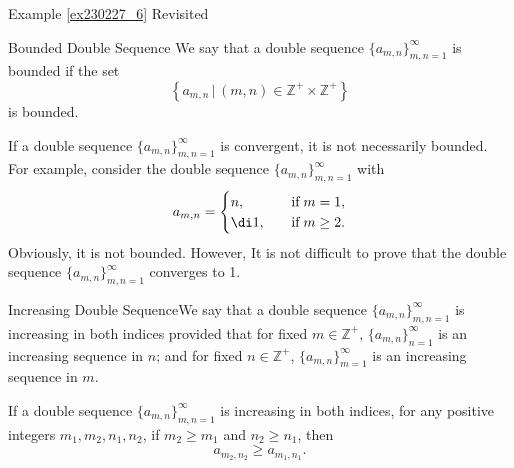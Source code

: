 \begin{example}{\linkt Example \ref{ex230227_6} Revisited}
\begin{example}[label=ex230227_13]{}
\begin{example}{}
\begin{definition}{Bounded Double Sequence}
We say that a double sequence $\{a_{m,n}\}_{m,n=1}^{\infty}$  is bounded if the set \[\left\{a_{m,n}\,|\,(m,n)\in\mathbb{Z}^+\times \mathbb{Z}^+\right\}\] is bounded.
\end{definition}
\begin{remark}
{}If a double sequence $\{a_{m,n}\}_{m,n=1}^{\infty}$  is convergent, it is not necessarily bounded. For example, consider the double  sequence  $\{a_{m,n}\}_{m,n=1}^{\infty}$ with
\[a_{m,n}=\begin{cases}n,\quad &\text{if}\; m=1,\\\di 1,\quad & \text{if}\; m\geq 2.\end{cases}\]
Obviously, it is not bounded. However, It is not difficult to prove that the double sequence $\{a_{m,n}\}_{m,n=1}^{\infty}$   converges to 1.
\end{remark}

\begin{definition}{Increasing Double Sequence}We say that  a double sequence $\{a_{m,n}\}_{m,n=1}^{\infty}$  is increasing in both indices provided that for fixed $m\in \mathbb{Z}^+$, $\{a_{m,n}\}_{n=1}^{\infty}$ is an increasing sequence in $n$; and for fixed $n\in\mathbb{Z}^+$, $\{a_{m,n}\}_{m=1}^{\infty}$ is an increasing sequence in $m$. \end{definition}

If a  double sequence $\{a_{m,n}\}_{m,n=1}^{\infty}$  is increasing in both indices, for any positive integers $m_1, m_2, n_1, n_2$, if $m_2\geq m_1$ and $n_2\geq n_1$, then
\[a_{m_2, n_2}\geq a_{m_1,n_1}.\]


\end{example}
\end{example}
\end{example}
